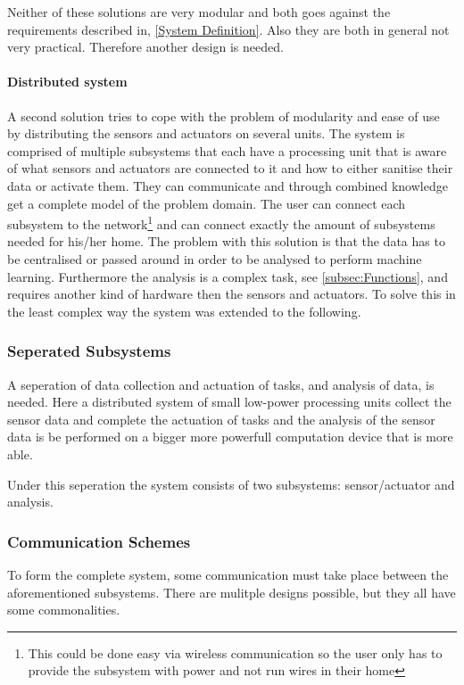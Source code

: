Neither of these solutions are very modular and both goes against the requirements described in, \cref{System Definition}. Also they are both in general not very practical. Therefore another design is needed.

\paragraph{Distributed system}
A second solution tries to cope with the problem of modularity and ease of use by distributing the sensors and actuators on several units. The system is comprised of multiple subsystems that each have a processing unit that is aware of what sensors and actuators are connected to it and how to either sanitise their data or activate them. They can communicate and through combined knowledge get a complete model of the problem domain. The user can connect each subsystem to the network\footnote{This could be done easy via wireless communication so the user only has to provide the subsystem with power and not run wires in their home} and can connect exactly the amount of subsystems needed for his/her home. The problem with this solution is that the data has to be centralised or passed around in order to be analysed to perform machine learning. Furthermore the analysis is a complex task, see \cref{subsec:Functions}, and requires another kind of hardware then the sensors and actuators. To solve this in the least complex way the system was extended to the following.

\subsubsection{Seperated Subsystems} A seperation of data collection and actuation of tasks, and analysis of
data, is needed. Here a distributed system of small low-power processing units collect the sensor data and complete the actuation of tasks and the analysis of the sensor data is be performed on a bigger more powerfull computation device that is more able.

Under this seperation the system consists of two subsystems: sensor/actuator
and analysis. 

\subsubsection{Communication Schemes} To form the complete system, some
communication must take place between the aforementioned subsystems. There are
mulitple designs possible, but they all have some commonalities.

